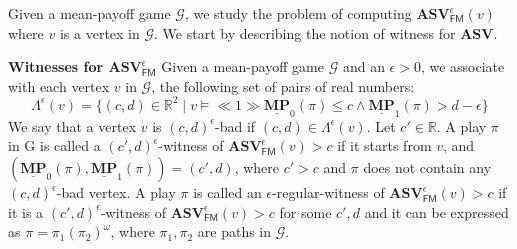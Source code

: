 Given a mean-payoff game $\mathcal{G}$, we study the problem of computing $\mathbf{ASV}^{\epsilon}_{\mathsf{FM}}(v)$ where $v$ is a vertex in $\mathcal{G}$. We start by describing the notion of witness for $\mathbf{ASV}$.

\noindent\textbf{Witnesses for $\mathbf{ASV}^{\epsilon}_{\mathsf{FM}}$} Given a mean-payoff game $\mathcal{G}$ and an $\epsilon > 0$, we associate with each vertex $v$ in $\mathcal{G}$, the following set of pairs of real numbers:
\begin{equation*}
\Lambda^{\epsilon}(v) = \{(c,d) \in \mathbb{R}^2 \mid v \models \ll 1 \gg \underline{\mathbf{MP}}_0(\pi) \leqslant c \land \underline{\mathbf{MP}}_1(\pi) > d-\epsilon \}
\end{equation*}
We say that a vertex $v$ is $(c,d)^{\epsilon}$-bad if $(c,d) \in \Lambda^{\epsilon}(v)$. Let $c' \in \mathbb{R}$.
A play $\pi$ in G is called a $(c',d)^{\epsilon}$-witness of $\mathbf{ASV}_{\mathsf{FM}}^{\epsilon}(v) > c$ if it starts from $v$, and $(\underline{\mathbf{MP}}_0(\pi), \underline{\mathbf{MP}}_1(\pi)) = (c', d)$, where $c' > c$ and $\pi$ does not contain any $(c,d)^{\epsilon}$-bad vertex. 
A play $\pi$ is called an $\epsilon$-regular-witness of $\mathbf{ASV}_{\mathsf{FM}}^{\epsilon}(v) > c$ if it is a $(c',d)^{\epsilon}$-witness of $\mathbf{ASV}_{\mathsf{FM}}^{\epsilon}(v) > c$ for some $c',d$ and it can be expressed as $\pi = \pi_1 (\pi_2)^{\omega}$, where $\pi_1, \pi_2$ are paths in $\mathcal{G}$.


